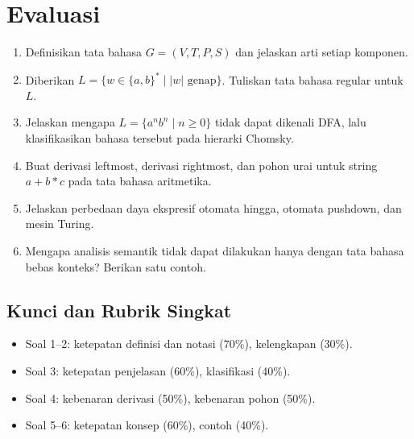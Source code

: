 \section*{Evaluasi}

\begin{enumerate}[label=\arabic*.,leftmargin=*]
  \item Definisikan tata bahasa \(G = (V,T,P,S)\) dan jelaskan arti
        setiap komponen.
  \item Diberikan \(L = \{w \in \{a,b\}^{*} \mid |w| \text{ genap}\}\).
        Tuliskan tata bahasa regular untuk \(L\).
  \item Jelaskan mengapa \(L = \{a^n b^n \mid n \ge 0\}\) tidak dapat
        dikenali DFA, lalu klasifikasikan bahasa tersebut pada
        hierarki Chomsky.
  \item Buat derivasi leftmost, derivasi rightmost, dan pohon urai
        untuk string \(a + b * c\) pada tata bahasa aritmetika.
  \item Jelaskan perbedaan daya ekspresif otomata hingga, otomata
        pushdown, dan mesin Turing.
  \item Mengapa analisis semantik tidak dapat dilakukan hanya dengan
        tata bahasa bebas konteks? Berikan satu contoh.
\end{enumerate}

\subsection*{Kunci dan Rubrik Singkat}
\begin{itemize}[leftmargin=*]
  \item Soal 1--2: ketepatan definisi dan notasi (70\%), kelengkapan
        (30\%).
  \item Soal 3: ketepatan penjelasan (60\%), klasifikasi (40\%).
  \item Soal 4: kebenaran derivasi (50\%), kebenaran pohon (50\%).
  \item Soal 5--6: ketepatan konsep (60\%), contoh (40\%).
\end{itemize}
